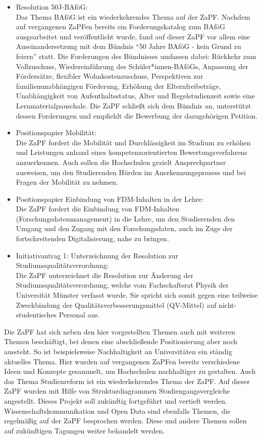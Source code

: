 \documentclass{scrartcl}
\begin{document}
\begin{itemize}
		\item Resolution 50J-BAföG:\\
Das Thema BAföG ist ein wiederkehrendes Thema auf der ZaPF. Nachdem auf vergangenen ZaPFen bereits ein Forderungskatalog zum BAföG ausgearbeitet und veröffentlicht wurde, fand auf dieser ZaPF vor allem eine Auseinandersetzung mit dem Bündnis “50 Jahre BAföG - kein Grund zu feiern” statt. Die Forderungen des Bündnisses umfassen dabei: Rückkehr zum Vollzuschuss, Wiedereinführung des Schüler*innen-BAföGs, Anpassung der Fördersätze, flexibler Wohnkostenzuschuss, Perspektiven zur familienunabhängigen Förderung, Erhöhung der Elternfreibeträge, Unabhängigkeit von Aufenthaltsstatus, Alter und Regelstudienzeit sowie eine Lernmaterialpauschale. Die ZaPF schließt sich dem Bündnis an, unterstützt dessen Forderungen und empfiehlt die Bewerbung der dazugehörigen Petition.

		\item Positionspapier Mobilität:\\
Die ZaPF fordert die Mobilität und Durchlässigkeit im Studium zu erhöhen und Leistungen anhand eines kompetenzorientierten Bewertungsverfahrens anzuerkennen. Auch sollen die Hochschulen gezielt Ansprechpartner ausweisen, um den Studierenden Hürden im Anerkennungsprozess und bei Fragen der Mobilität zu nehmen.

		\item Positionspapier Einbindung von FDM-Inhalten in der Lehre:\\
Die ZaPF fordert die Einbindung von FDM-Inhalten (Forschungsdatenmanagement) in die Lehre, um den Studierenden den Umgang und den Zugang mit den Forschungsdaten, auch im Zuge der fortschreitenden Digitalisierung, nahe zu bringen.

		\item Initiativantrag 1: Unterzeichnung der Resolution zur Studiumsqualitätsverordnung:\\
Die ZaPF unterzeichnet die Resolution zur Änderung der Studiumsqualitätsverordnung, welche vom Fachschaftsrat Physik der Universität Münster verfasst wurde. Sie spricht sich somit gegen eine teilweise Zweckbindung der Qualitätsverbesserungsmittel (QV-Mittel) auf nicht-studentisches Personal aus.

	\end{itemize}

Die ZaPF hat sich neben den hier vorgestellten Themen auch mit weiteren Themen beschäftigt, bei denen eine abschließende Positionierung aber noch aussteht. So ist beispielsweise Nachhaltigkeit an Universitäten ein ständig aktuelles Thema. Hier wurden auf vergangenen ZaPFen bereits verschiedene Ideen und Konzepte gesammelt, um Hochschulen nachhaltiger zu gestalten. Auch das Thema Studienreform ist ein wiederkehrendes Thema der ZaPF. Auf dieser ZaPF wurden mit Hilfe von Strukturdiagrammen Studiengangsvergleiche angestellt. Dieses Projekt soll zukünftig fortgeführt und vertieft werden. Wissenschaftskommunikation und Open Data sind ebenfalls Themen, die regelmäßig auf der ZaPF besprochen werden. Diese und andere Themen sollen auf zukünftigen Tagungen weiter behandelt werden.
\end{document}

